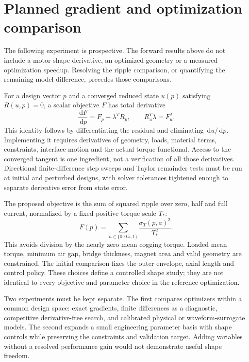 \documentclass{anvil-paper}
\newcommand{\dd}{\,\mathrm{d}}
\begin{document}
\section{Planned gradient and optimization comparison}\label{sec:planned}
The following experiment is prospective. The forward results above do
not include a motor shape derivative, an optimized geometry or a measured
optimization speedup. Resolving the ripple comparison, or quantifying
the remaining model difference, precedes those comparisons.

For a design vector $p$ and a converged reduced state $u(p)$ satisfying
$R(u,p)=0$, a scalar objective $F$ has total derivative
\begin{equation}
 \frac{\dd F}{\dd p}=F_p-\lambda^T R_p,\qquad
 R_u^T\lambda=F_u^T.
 \label{eq:adjoint}
\end{equation}
This identity follows by differentiating the residual and eliminating
$\dd u/\dd p$. Implementing it requires derivatives of geometry, loads,
material terms, constraints, interface motion and the actual torque
functional. Access to the converged tangent is one ingredient, not a
verification of all those derivatives. Directional finite-difference
step sweeps and Taylor remainder tests must be run at initial and perturbed
designs, with solver tolerances tightened enough to separate derivative
error from state error.

The proposed objective is the sum of squared ripple over zero, half and
full current, normalized by a fixed positive torque scale $T_*$:
\begin{equation}
 F(p)=\sum_{a\in\{0,0.5,1\}}
       \frac{\sigma_T(p,a)^2}{T_*^2}.
\end{equation}
This avoids division by the nearly zero mean cogging torque. Loaded mean
torque, minimum air gap, bridge thickness, magnet area and valid geometry
are constrained. The initial comparison fixes the outer envelope, axial
length and control policy. These choices define a controlled shape study;
they are not identical to every objective and parameter choice in the
reference optimization.

Two experiments must be kept separate. The first compares optimizers
within a common design space: exact gradients, finite differences as a
diagnostic, competitive derivative-free search, and calibrated physical
or waveform-surrogate models. The second expands a small engineering
parameter basis with shape controls while preserving the constraints and
validation target. Adding variables without a resolved performance gain
would not demonstrate useful shape freedom.
\end{document}
